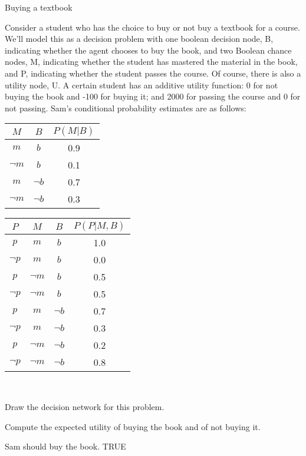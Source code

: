 \begin{problem}[10]{Buying a textbook}

Consider a student who has the choice to buy or not buy a textbook for a course. We'll model this as a decision problem with one boolean decision node, B, indicating whether the agent chooses to buy the book, and two Boolean chance nodes, M, indicating whether the student has mastered the material in the book, and P, indicating whether the student passes the course. Of course, there is also a utility node, U. A certain student has an additive utility function: 0 for not buying the book and -100 for buying it; and 2000 for passing the course and 0 for not passing. Sam's conditional probability estimates are as follows:

\hspace{4cm}
\begin{tabular}{ | c | c | c | }
  \hline
  $M$ & $B$ & $P(M|B)$ \\ \hline
  $m$ & $b$ & 0.9 \\ \hline
  $\lnot m$ & $b$ & 0.1 \\ \hline
  $m$ & $\lnot b$ & 0.7 \\ \hline
  $\lnot m$ & $\lnot b$ & 0.3 \\ \hline
\end{tabular}
\hspace{1cm}
\begin{tabular}{ | c | c | c | c | }
  \hline
  $P$ & $M$ & $B$ & $P(P|M,B)$ \\ \hline
  $p$ & $m$ & $b$ & 1.0 \\ \hline
  $\lnot p$ & $m$ & $b$ & 0.0 \\ \hline
  $p$ & $\lnot m$ & $b$ & 0.5 \\ \hline
  $\lnot p$ & $\lnot m$ & $b$ & 0.5 \\ \hline
  $p$ & $m$ & $\lnot b$ & 0.7 \\ \hline
  $\lnot p$ & $m$ & $\lnot b$ & 0.3 \\ \hline
  $p$ & $\lnot m$ & $\lnot b$ & 0.2 \\ \hline
  $\lnot p$ & $\lnot m$ & $\lnot b$ & 0.8 \\ \hline
\end{tabular}
\\

\begin{question}[4] Draw the decision network for this problem. \\
\fbox{\begin{minipage}[t][5cm][t]{17cm}
\FourA
\end{minipage}}
\end{question}

\begin{question}[4] Compute the expected utility of buying the book and of not buying it. \\
\fbox{\begin{minipage}[t][7cm][t]{17cm}
\FourB
\end{minipage}}
\end{question}

{
\renewcommand\truefalsepoints{2}
\begin{truefalse}[\FourC]
Sam should buy the book. TRUE
\end{truefalse}}

\end{problem}